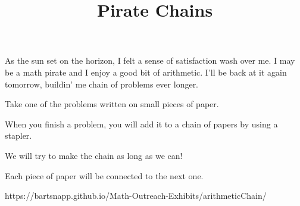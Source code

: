\documentclass{../exhibit}
\title{Pirate Chains}
\begin{document}
\begin{context}
  As the sun set on the horizon, I felt a sense of satisfaction wash over me. I may be a math pirate and I enjoy a good bit of arithmetic. I'll be back at it again tomorrow, buildin' me chain of problems ever longer.
\end{context}

\begin{directions}
Take one of the problems written on small pieces of paper.

When you finish a problem, you will add it to a chain of papers by using a stapler.

We will try to make the chain as long as we can!

Each piece of paper will be connected to the next one.
\end{directions}

\begin{example}
\end{example}

\begin{mathConnections}
  https://bartsnapp.github.io/Math-Outreach-Exhibits/arithmeticChain/
\end{mathConnections}
\end{document}
